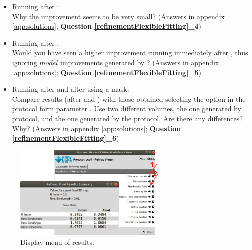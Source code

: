   \begin{itemize}
   \item Running  after \phenix {}:\\
   Why the improvement seems to be very small? (Answers in appendix \ref{app:solutions}; \textbf{Question \ref{refinementFlexibleFitting}\_4})\\
   \item Running  after \coot:\\
   Would you have seen a higher improvement running  immediately after \coot, thus ignoring $model$ improvements generated by \phenix {}? (Answers in appendix \ref{app:solutions}; \textbf{Question \ref{refinementFlexibleFitting}\_5})\\
   \item Running  after \coot and after \phenix {} using a mask:\\
   Compare  results (after \coot and \phenix {}) with those obtained selecting the option  in the protocol form parameter . Use two different volumes, the one generated by \coot protocol, and the one generated by the  protocol. Are there any differences? Why? (Answers in appendix \ref{app:solutions}; \textbf{Question \ref{refinementFlexibleFitting}\_6})\\
  \end{itemize}
  
  \begin{figure}[H]
  \centering 
  \captionsetup{width=.9\linewidth} 
  \includegraphics[width=0.65\textwidth]{Images/Fig32}
  \caption{Display menu of  results.}
  \label{fig:refmac_display_results}
  \end{figure}
  
